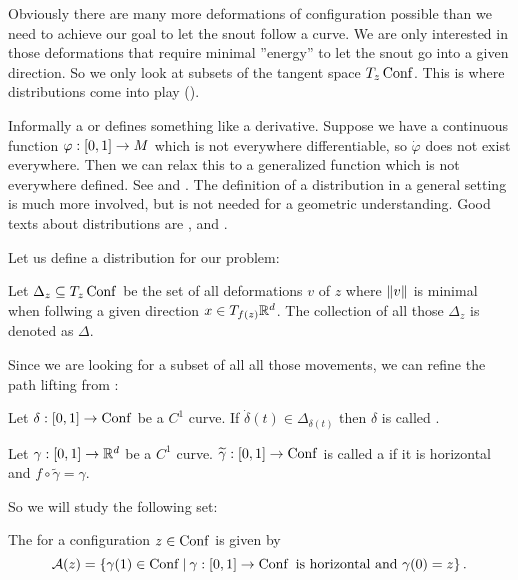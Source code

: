Obviously there are many more deformations of configuration possible than we need to
achieve our goal to let the snout follow a curve. We are only interested in those
deformations that require minimal ”energy” to let the snout go into a given direction.
So we only look at subsets of the tangent space $T_z\operatorname{Conf}$. This is where distributions
come into play (\cite[p. 8]{Rodriguez06}).

Informally a  or  defines
something like a derivative. Suppose we have a continuous function
$\varphi : [0,1] \rightarrow M$ which is not everywhere differentiable,
so $\dot{\varphi}$ does not exist everywhere. Then we can relax this
to a generalized function which is not everywhere defined.
See \cite[p. 228ff]{EncyplopMath} and \cite[p. 257]{Treves}.
The definition of a distribution in a general setting is much more involved,
but is not needed for a geometric understanding. Good texts about distributions
are \cite[p. 158]{Boothby}, \cite[p. 34]{Chern} and \cite[p. 86ff]{Chevalley}.

Let us define a distribution for our problem:
\begin{definition}
    Let $\Delta_z \subseteq T_z\operatorname{Conf}$ be the set of all deformations $v$ of $z$
    where $\left\Vert{v}\right\Vert$ is minimal when follwing a given direction $x \in T_{f(z)}\mathbb{R}^d$.
    The collection of all those $\Delta_z$ is denoted as $\Delta$.
\end{definition}

Since we are looking for a subset of all all those movements, we can refine the
path lifting from :
\begin{definition}[Horizontal]
    Let $\delta : [0,1] \rightarrow \operatorname{Conf}$ be a $C^1$ curve. If
    $\dot{\delta}(t) \in \Delta_{\delta(t)}$ then $\delta$
    is called .
    
    Let $\gamma : [0,1] \rightarrow \mathbb{R}^d$ be a $C^1$ curve.
    $\widetilde{\gamma} : [0,1] \rightarrow \operatorname{Conf}$ is called
    a  if it is horizontal and
    $f \circ \widetilde{\gamma} = \gamma$.
\end{definition}

So we will study the following set:
\begin{definition}
    The  for a configuration $z \in \operatorname{Conf}$ is
    given by
    \[ \mathcal{A}(z) =
        \left\{{\gamma(1) \in \operatorname{Conf}} \:|\: {\gamma : [0,1] \rightarrow \operatorname{Conf}
            \text{ is horizontal and } \gamma(0) = z}\right\}.
    \]
\end{definition}

